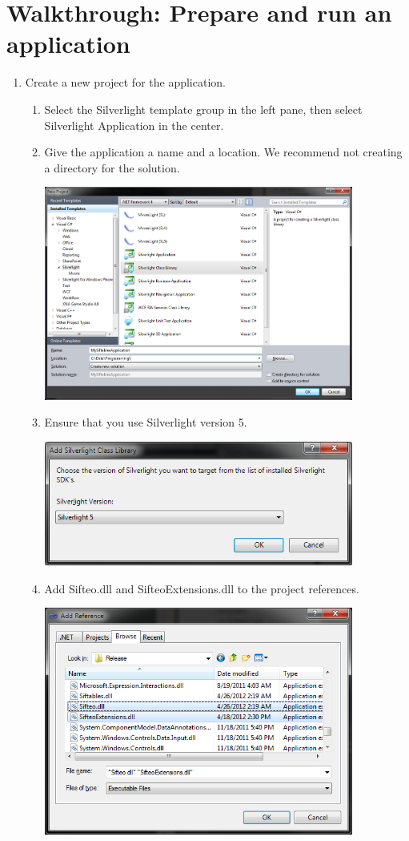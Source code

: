 \documentclass[12pt]{article}
\begin{document}
\section{Walkthrough: Prepare and run an application}
\begin{enumerate}

\item Create a new project for the application.
\begin{enumerate}
\item Select the Silverlight template group in the left pane, then select Silverlight Application in the center.
\item Give the application a name and a location. We recommend not creating a directory for the solution.
\begin{center}\includegraphics[width=4in]{1-1-NewProjectDialog}\end{center}
\item Ensure that you use Silverlight version 5.
\begin{center}\includegraphics[width=4in]{1-2-NewSilverlightApp}\end{center}
\item Add Sifteo.dll and SifteoExtensions.dll to the project references.
\begin{center}\includegraphics[width=4in]{1-3-AddReferences}\end{center}
\end{enumerate}


\end{enumerate}
\end{document}
